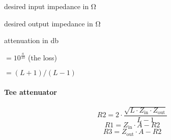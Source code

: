 \documentclass[varwidth,convert={density=300,size=800x800,outext=.png}]{standalone}
\newcommand{\Zin}{Z_\mathrm{in}}
\newcommand{\Zout}{Z_\mathrm{out}}
\begin{document}
\begin{description}[labelindent=0pt,labelsep=10pt]
\item[$\Zin$] desired input impedance in \si{\ohm}
\item[$\Zout$] desired output impedance in \si{\ohm}
\item[$a$] attenuation in \si{\decibel}
\item[$L$] $= 10^{\frac{a}{10}}$ (the loss)
\item[$A$] $= (L+1)/(L-1)$
\end{description}

\paragraph{Tee attenuator}

\[R2 = 2 \cdot \frac{\sqrt{L \cdot \Zin \cdot \Zout}}{L - 1}\]
\[R1 = \Zin \cdot A - R2\]
\[R3 = \Zout \cdot A - R2\]
\end{document}
